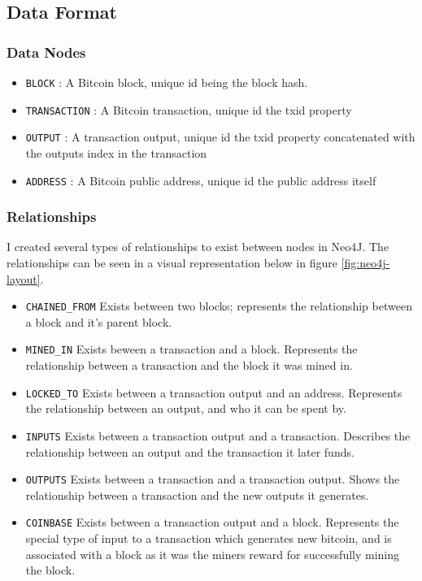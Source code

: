 \subsection{Data Format}

\subsubsection{Data Nodes}
\begin{itemize}
    \item \texttt{BLOCK} : A Bitcoin block, unique id being the block hash. 
    \item \texttt{TRANSACTION} : A Bitcoin transaction, unique id the txid property
    \item \texttt{OUTPUT} : A transaction output, unique id the txid property concatenated with the outputs index in the transaction
    \item \texttt{ADDRESS} : A Bitcoin public address, unique id the public address itself
\end{itemize}

\subsubsection{Relationships}
I created several types of relationships to exist between nodes in Neo4J. The relationships can be seen in a visual representation below in figure \ref{fig:neo4j-layout}.
\begin{itemize}
    \item \texttt{CHAINED\_FROM} Exists between two blocks; represents the relationship between a block and it's parent block. 
    \item \texttt{MINED\_IN} Exists beween a transaction and a block. Represents the relationship between a transaction and the block it was mined in. 
    \item \texttt{LOCKED\_TO} Exists between a transaction output and an address. Represents the relationship between an output, and who it can be spent by. 
    \item \texttt{INPUTS} Exists between a transaction output and a transaction. Describes the relationship between an output and the transaction it later funds. 
    \item \texttt{OUTPUTS} Exists between a transaction and a transaction output. Shows the relationship between a transaction and the new outputs it generates. 
    \item \texttt{COINBASE} Exists between a transaction output and a block. Represents the special type of input to a transaction which generates new bitcoin, and is associated with a block as it was the miners reward for successfully mining the block. 
\end{itemize}

